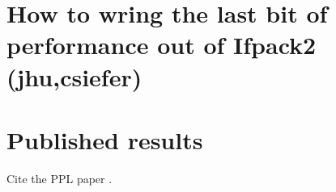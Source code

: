 \section{How to wring the last bit of performance out of Ifpack2 (jhu,csiefer)}
\section{Published results}
Cite the PPL paper \cite{Lin2014}.
